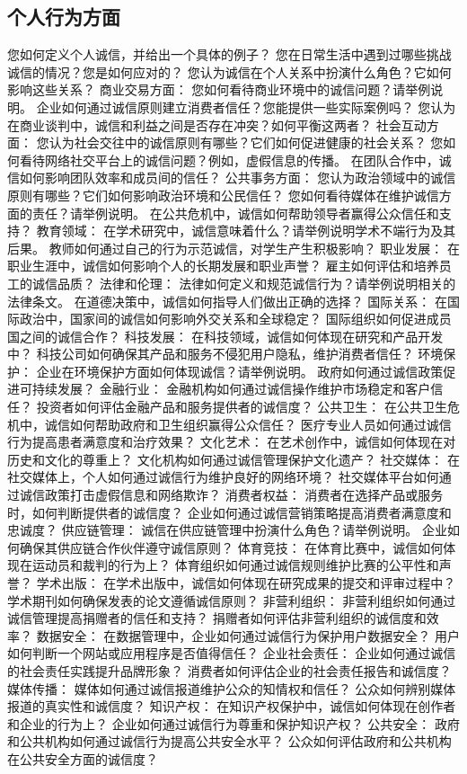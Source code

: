 \documentclass[12pt]{book}
\begin{document}
\subsection{个人行为方面}
您如何定义个人诚信，并给出一个具体的例子？
您在日常生活中遇到过哪些挑战诚信的情况？您是如何应对的？
您认为诚信在个人关系中扮演什么角色？它如何影响这些关系？
商业交易方面：
您如何看待商业环境中的诚信问题？请举例说明。
企业如何通过诚信原则建立消费者信任？您能提供一些实际案例吗？
您认为在商业谈判中，诚信和利益之间是否存在冲突？如何平衡这两者？
社会互动方面：
您认为社会交往中的诚信原则有哪些？它们如何促进健康的社会关系？
您如何看待网络社交平台上的诚信问题？例如，虚假信息的传播。
在团队合作中，诚信如何影响团队效率和成员间的信任？
公共事务方面：
您认为政治领域中的诚信原则有哪些？它们如何影响政治环境和公民信任？
您如何看待媒体在维护诚信方面的责任？请举例说明。
在公共危机中，诚信如何帮助领导者赢得公众信任和支持？
教育领域：
在学术研究中，诚信意味着什么？请举例说明学术不端行为及其后果。
教师如何通过自己的行为示范诚信，对学生产生积极影响？
职业发展：
在职业生涯中，诚信如何影响个人的长期发展和职业声誉？
雇主如何评估和培养员工的诚信品质？
法律和伦理：
法律如何定义和规范诚信行为？请举例说明相关的法律条文。
在道德决策中，诚信如何指导人们做出正确的选择？
国际关系：
在国际政治中，国家间的诚信如何影响外交关系和全球稳定？
国际组织如何促进成员国之间的诚信合作？
科技发展：
在科技领域，诚信如何体现在研究和产品开发中？
科技公司如何确保其产品和服务不侵犯用户隐私，维护消费者信任？
环境保护：
企业在环境保护方面如何体现诚信？请举例说明。
政府如何通过诚信政策促进可持续发展？
金融行业：
金融机构如何通过诚信操作维护市场稳定和客户信任？
投资者如何评估金融产品和服务提供者的诚信度？
公共卫生：
在公共卫生危机中，诚信如何帮助政府和卫生组织赢得公众信任？
医疗专业人员如何通过诚信行为提高患者满意度和治疗效果？
文化艺术：
在艺术创作中，诚信如何体现在对历史和文化的尊重上？
文化机构如何通过诚信管理保护文化遗产？
社交媒体：
在社交媒体上，个人如何通过诚信行为维护良好的网络环境？
社交媒体平台如何通过诚信政策打击虚假信息和网络欺诈？
消费者权益：
消费者在选择产品或服务时，如何判断提供者的诚信度？
企业如何通过诚信营销策略提高消费者满意度和忠诚度？
供应链管理：
诚信在供应链管理中扮演什么角色？请举例说明。
企业如何确保其供应链合作伙伴遵守诚信原则？
体育竞技：
在体育比赛中，诚信如何体现在运动员和裁判的行为上？
体育组织如何通过诚信规则维护比赛的公平性和声誉？
学术出版：
在学术出版中，诚信如何体现在研究成果的提交和评审过程中？
学术期刊如何确保发表的论文遵循诚信原则？
非营利组织：
非营利组织如何通过诚信管理提高捐赠者的信任和支持？
捐赠者如何评估非营利组织的诚信度和效率？
数据安全：
在数据管理中，企业如何通过诚信行为保护用户数据安全？
用户如何判断一个网站或应用程序是否值得信任？
企业社会责任：
企业如何通过诚信的社会责任实践提升品牌形象？
消费者如何评估企业的社会责任报告和诚信度？
媒体传播：
媒体如何通过诚信报道维护公众的知情权和信任？
公众如何辨别媒体报道的真实性和诚信度？
知识产权：
在知识产权保护中，诚信如何体现在创作者和企业的行为上？
企业如何通过诚信行为尊重和保护知识产权？
公共安全：
政府和公共机构如何通过诚信行为提高公共安全水平？
公众如何评估政府和公共机构在公共安全方面的诚信度？
\end{document}
